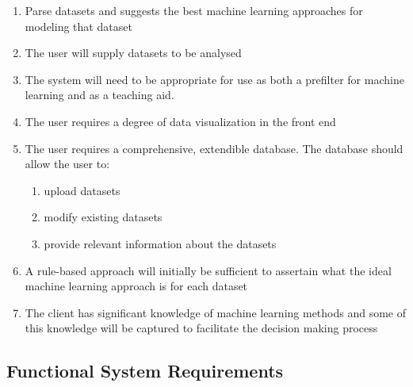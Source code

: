 \documentclass[titlepage]{article}
\begin{document}
\begin{enumerate}
  \item Parse datasets and suggests the best machine learning approaches for modeling that dataset

  \item The user will supply datasets to be analysed
  
  \item The system will need to be appropriate for use as both a prefilter for machine learning and as a teaching aid.
  
  \item The user requires a degree of data visualization in the front end
  
  \item The user requires a comprehensive, extendible database. The database should allow the user to:
  \begin{enumerate}
    \item upload datasets
    \item modify existing datasets
    \item provide relevant information about the datasets
  \end{enumerate}
  
  \item A rule-based approach will initially be sufficient to assertain what the ideal machine learning approach is for each dataset
  
  \item The client has significant knowledge of machine learning methods and some of this knowledge will be captured to facilitate the decision making process
\end{enumerate}

\subsection{Functional System Requirements}
\end{document}
